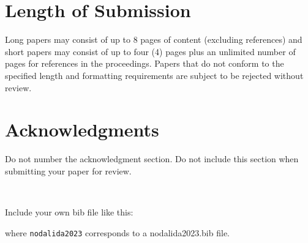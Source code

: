 \documentclass[11pt]{article}
\begin{document}
\section{Length of Submission}
\label{sec:length}

Long papers may consist of up to 8 pages of content (excluding
references) and short papers may consist of up to 
four (4) pages plus an unlimited number of pages for references in the proceedings.  Papers that do not conform to the
specified length and formatting requirements are subject to be
rejected without review.

\section*{Acknowledgments}

Do not number the acknowledgment section. Do not include this section
when submitting your paper for review.

~


\noindent Include your own bib file like this:

\noindent \verb||
\verb|| 

\noindent where \verb|nodalida2023| corresponds to a nodalida2023.bib file.





\end{document}
